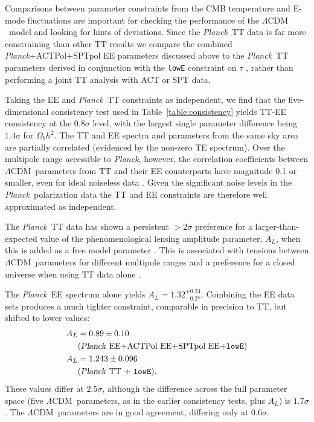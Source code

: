 \documentclass[twocolumn]{aastex63}
\newcommand{\planck}{\textsl{Planck}}
\newcommand{\lcdm}{\ensuremath{\Lambda\mathrm{CDM}}}
\begin{document}
Comparisons between parameter constraints from the CMB temperature and E-mode fluctuations are important for checking the performance of the \lcdm\ model and looking for hints of deviations. Since the \planck\ TT data is far more constraining than other TT results we compare the combined \planck+ACTPol+SPTpol EE parameters discussed above to the \planck\ TT parameters derived in conjunction with the \texttt{lowE} constraint on $\tau$ \citep{planck2016-l06}, rather than performing a joint TT analysis with ACT or SPT data.

Taking the EE and \planck\ TT constraints as independent, we find that the five-dimensional consistency test used in Table~\ref{table:consistency} yields TT-EE consistency at the $0.8\sigma$ level, with the largest single parameter difference being $1.4\sigma$ for $\Omega_bh^2$. The TT and EE spectra and parameters from the same sky area are partially correlated (evidenced by the non-zero TE spectrum). Over the multipole range accessible to \planck, however, the correlation coefficients between \lcdm\ parameters from TT and their EE counterparts have magnitude 0.1 or smaller, even for ideal noiseless data \citep[see Figs.~4 and 5 of][]{kable/addison/bennett:2020}. Given the significant noise levels in the \planck\ polarization data the TT and EE constraints are therefore well approximated as independent.

The \planck\ TT data has shown a persistent $>2\sigma$ preference for a larger-than-expected value of the phenomenological lensing amplitude parameter, $A_L$, when this is added as a free model parameter \citep[see][for most recent results]{planck2016-l06,efstathiou/gratton:2019}. This is associated with tensions between \lcdm\ parameters for different multipole ranges and a preference for a closed universe when using TT data alone \citep[e.g.,][]{planck2014-a13,addison/etal:2016,planck2016-LI,divalentino/melchiorri/silk:2020,efstathiou/gratton:2020,handley:2021}.

The \planck\ EE spectrum alone yields $A_L=1.32^{+0.24}_{-0.27}$. Combining the EE data sets produces a much tighter constraint, comparable in precision to TT, but shifted to lower values:
\begin{align}
\nonumber A_L&=0.89\pm0.10\\&\textrm{(\planck\ EE+ACTPol EE+SPTpol EE+\texttt{lowE})}\\
\nonumber A_L&=1.243\pm0.096\\\nonumber&\textrm{(\planck\ TT + \texttt{lowE})}.
\end{align}
These values differ at $2.5\sigma$, although the difference across the full parameter space (five \lcdm\ parameters, as in the earlier consistency tests, plus $A_L$) is $1.7\sigma$. The \lcdm\ parameters are in good agreement, differing only at $0.6\sigma$.
\end{document}
